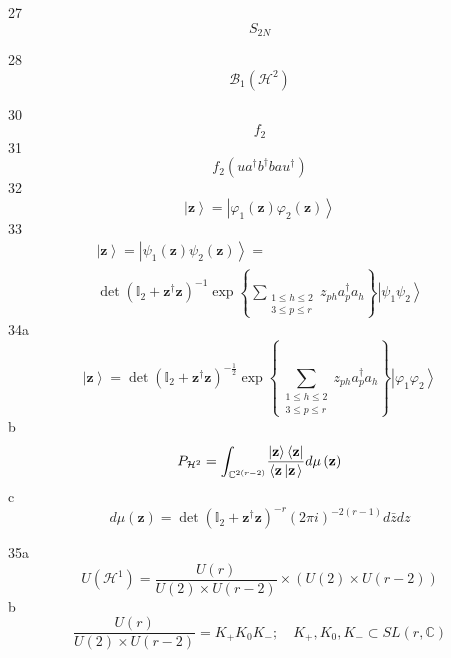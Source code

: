 \documentclass[aps,preprint]{revtex4}%
\begin{document}
27%
\[
S_{2N}%
\]




28%
\[
\mathcal{B}_{1}\left(  \mathcal{H}^{2}\right)
\]


30%
\[
f_{2}%
\]
31%
\[
f_{2}\left(  ua^{\dagger}b^{\dagger}bau^{\dagger}\right)
\]
32%
\[
\left\vert \mathbf{z}\right\rangle =\left\vert \varphi_{1}\left(
\mathbf{z}\right)  \varphi_{2}\left(  \mathbf{z}\right)  \right\rangle
\]
33%
\begin{gather*}
\left\vert \mathbf{z}\right\rangle =\left\vert \psi_{1}\left(  \mathbf{z}%
\right)  \psi_{2}\left(  \mathbf{z}\right)  \right\rangle =\\
\det\left(  \mathbb{I}_{2}+\mathbf{z}^{\dagger}\mathbf{z}\right)  ^{-1}%
\exp\left\{  \sum\limits_{\substack{1\leq h\leq2\\3\leq p\leq r}}z_{ph}%
a_{p}^{\dagger}a_{h}\right\}  \left\vert \psi_{1}\psi_{2}\right\rangle
\end{gather*}
34a%
\[
\left\vert \mathbf{z}\right\rangle =\det\left(  \mathbb{I}_{2}+\mathbf{z}%
^{\dagger}\mathbf{z}\right)  ^{-\frac{1}{2}}\exp\left\{  \sum
\limits_{\substack{1\leq h\leq2\\3\leq p\leq r}}z_{ph}a_{p}^{\dagger}%
a_{h}\right\}  \left\vert \varphi_{1}\varphi_{2}\right\rangle
\]
b%
\[
P_{\mathcal{H}^{2}}={\Large {\int_{\mathbb{C}^{2\left(  r-2\right)  }}}}%
\frac{\left\vert \mathbf{z}\right\rangle \left\langle \mathbf{z}\right\vert
}{\left\langle \mathbf{z}\left\vert \mathbf{z}\right.  \right\rangle }%
d\mu\left(  \mathbf{z}\right)
\]
c%
\[
d\mu\left(  \mathbf{z}\right)  =\det\left(  \mathbb{I}_{2}+\mathbf{z}%
^{\dagger}\mathbf{z}\right)  ^{-r}\left(  2\pi i\right)  ^{-2\left(
r-1\right)  }d\bar{z}dz
\]


35a%
\[
U\left(  \mathcal{H}^{1}\right)  =\frac{U\left(  r\right)  }{U\left(
2\right)  \times U\left(  r-2\right)  }\times\left(  U\left(  2\right)  \times
U\left(  r-2\right)  \right)
\]
b%
\[
\frac{U\left(  r\right)  }{U\left(  2\right)  \times U\left(  r-2\right)
}=K_{+}K_{0}K_{-};\quad K_{+},K_{0},K_{-}\subset SL\left(  r,\mathbb{C}%
\right)
\]
\end{document}
